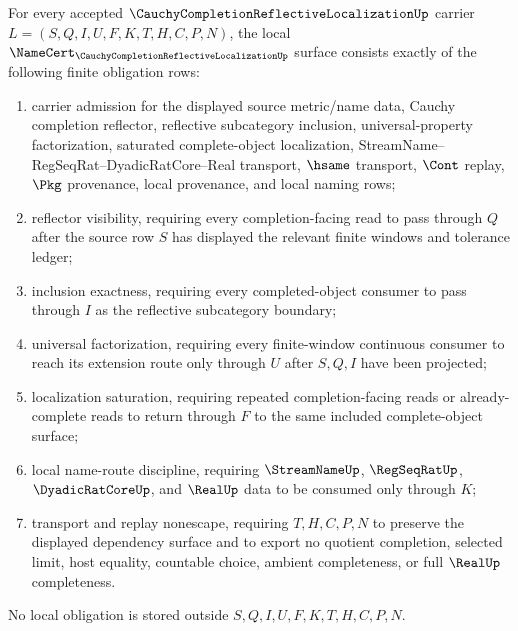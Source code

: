 \begin{theorem}
\label{thm:cauchy-completion-reflective-localization-namecert-obligations}
For every accepted $\CauchyCompletionReflectiveLocalizationUp$ carrier $L=(S,Q,I,U,F,K,T,H,C,P,N)$, the local $\NameCert_{\CauchyCompletionReflectiveLocalizationUp}$ surface consists exactly of the following finite obligation rows:
\begin{enumerate}
\item carrier admission for the displayed source metric/name data, Cauchy completion reflector, reflective subcategory inclusion, universal-property factorization, saturated complete-object localization, StreamName--RegSeqRat--DyadicRatCore--Real transport, $\hsame$ transport, $\Cont$ replay, $\Pkg$ provenance, local provenance, and local naming rows;
\item reflector visibility, requiring every completion-facing read to pass through $Q$ after the source row $S$ has displayed the relevant finite windows and tolerance ledger;
\item inclusion exactness, requiring every completed-object consumer to pass through $I$ as the reflective subcategory boundary;
\item universal factorization, requiring every finite-window continuous consumer to reach its extension route only through $U$ after $S,Q,I$ have been projected;
\item localization saturation, requiring repeated completion-facing reads or already-complete reads to return through $F$ to the same included complete-object surface;
\item local name-route discipline, requiring $\StreamNameUp$, $\RegSeqRatUp$, $\DyadicRatCoreUp$, and $\RealUp$ data to be consumed only through $K$;
\item transport and replay nonescape, requiring $T,H,C,P,N$ to preserve the displayed dependency surface and to export no quotient completion, selected limit, host equality, countable choice, ambient completeness, or full $\RealUp$ completeness.
\end{enumerate}
No local obligation is stored outside $S,Q,I,U,F,K,T,H,C,P,N$.
\end{theorem}
